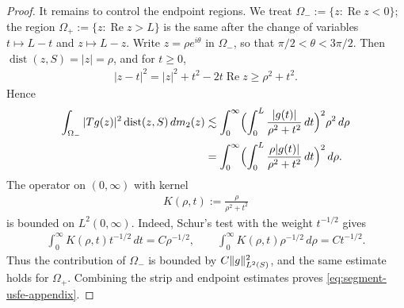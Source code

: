 \documentclass[11pt,a4paper,english,reqno]{amsart}
\numberwithin{equation}{section}
\DeclareMathOperator{\dist}{dist}
\DeclarePairedDelimiter{\paren}{(}{)}
\DeclarePairedDelimiter{\norm}{\lVert}{\rVert}
\renewcommand\Re{\operatorname{Re}}%
\numberwithin{definition}{section}
\begin{document}
\begin{proof}
  It remains to control the endpoint regions.  We treat $\Omega_-:=\{z:\Re z<0\}$; the region $\Omega_+:=\{z:\Re z>L\}$ is the same after the change of variables $t\mapsto L-t$ and $z\mapsto L-z$.  Write $z=\rho e^{i\theta}$ in $\Omega_-$, so that $\pi/2<\theta<3\pi/2$.  Then $\dist(z,S)=|z|=\rho$, and for $t\ge0$,
  \begin{align}
    |z-t|^2=|z|^2+t^2-2t\Re z\ge \rho^2+t^2 .
  \end{align}
  Hence
  \begin{align}
    \int_{\Omega_-}|Tg(z)|^2\dist(z,S)\,dm_2(z)
    &\lesssim
    \int_0^\infty
      \paren[\Big]{\int_0^L\frac{|g(t)|}{\rho^2+t^2}\,dt}^2\rho^2\,d\rho \\
    &=
    \int_0^\infty
      \paren[\Big]{\int_0^L\frac{\rho |g(t)|}{\rho^2+t^2}\,dt}^2\,d\rho .
  \end{align}
  The operator on $(0,\infty)$ with kernel
  \begin{align}
    K(\rho,t):=\frac{\rho}{\rho^2+t^2}
  \end{align}
  is bounded on $L^2(0,\infty)$.  Indeed, Schur's test with the weight $t^{-1/2}$ gives
  \begin{align}
    \int_0^\infty K(\rho,t)t^{-1/2}\,dt=C\rho^{-1/2},
    \qquad
    \int_0^\infty K(\rho,t)\rho^{-1/2}\,d\rho=Ct^{-1/2}.
  \end{align}
  Thus the contribution of $\Omega_-$ is bounded by $C\norm{g}_{L^2(S)}^2$, and the same estimate holds for $\Omega_+$.  Combining the strip and endpoint estimates proves \cref{eq:segment-usfe-appendix}.
\end{proof}
\end{document}
